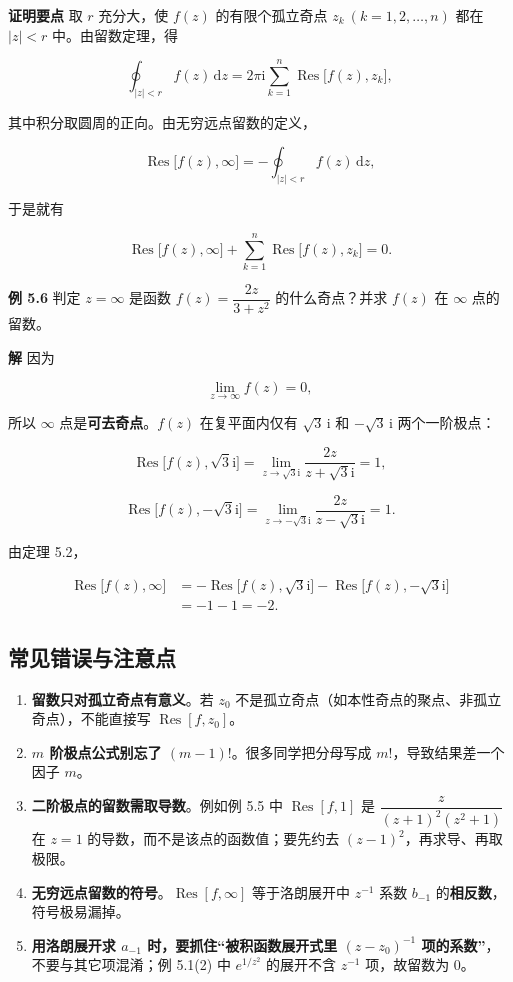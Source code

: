 \textbf{证明要点} 取 \(r\) 充分大，使 \(f(z)\) 的有限个孤立奇点
\(z_k\ (k=1,2,\ldots,n)\) 都在 \(|z|<r\) 中。由留数定理，得

\[
\oint_{|z|<r}f(z)\,\mathrm dz
=2\pi\mathrm i\sum_{k=1}^{n}\operatorname{Res}\bigl[f(z),z_k\bigr],
\]

其中积分取圆周的正向。由无穷远点留数的定义，

\[
\operatorname{Res}\bigl[f(z),\infty\bigr]=-\oint_{|z|<r}f(z)\,\mathrm dz,
\]

于是就有

\[
\operatorname{Res}\bigl[f(z),\infty\bigr]+\sum_{k=1}^{n}\operatorname{Res}\bigl[f(z),z_k\bigr]=0 .
\]

\textbf{例 5.6} 判定 \(z=\infty\) 是函数 \(f(z)=\dfrac{2z}{3+z^{2}}\)
的什么奇点？并求 \(f(z)\) 在 \(\infty\) 点的留数。

\textbf{解} 因为

\[
\lim_{z\to\infty}f(z)=0,
\]

所以 \(\infty\) 点是\textbf{可去奇点}。\(f(z)\) 在复平面内仅有
\(\sqrt3\,\mathrm i\) 和 \(-\sqrt3\,\mathrm i\) 两个一阶极点：

\[
\operatorname{Res}\bigl[f(z),\sqrt3\mathrm i\bigr]
=\lim_{z\to\sqrt3\mathrm i}\frac{2z}{z+\sqrt3\mathrm i}=1,
\]

\[
\operatorname{Res}\bigl[f(z),-\sqrt3\mathrm i\bigr]
=\lim_{z\to-\sqrt3\mathrm i}\frac{2z}{z-\sqrt3\mathrm i}=1.
\]

由定理 5.2，

\[
\begin{aligned}
\operatorname{Res}\bigl[f(z),\infty\bigr]
&=-\operatorname{Res}\bigl[f(z),\sqrt3\mathrm i\bigr]-\operatorname{Res}\bigl[f(z),-\sqrt3\mathrm i\bigr]\\
&=-1-1=-2 .
\end{aligned}
\]

\subsection{常见错误与注意点}\label{ux5e38ux89c1ux9519ux8befux4e0eux6ce8ux610fux70b9-12}

\begin{enumerate}
\def\labelenumi{\arabic{enumi}.}
\tightlist
\item
  \textbf{留数只对孤立奇点有意义}。若 \(z_0\)
  不是孤立奇点（如本性奇点的聚点、非孤立奇点），不能直接写
  \(\operatorname{Res}[f,z_0]\)。
\item
  \textbf{\(m\) 阶极点公式别忘了 \((m-1)!\)}。很多同学把分母写成
  \(m!\)，导致结果差一个因子 \(m\)。
\item
  \textbf{二阶极点的留数需取导数}。例如例 5.5 中
  \(\operatorname{Res}[f,1]\) 是 \(\dfrac{z}{(z+1)^2(z^2+1)}\) 在
  \(z=1\) 的导数，而不是该点的函数值；要先约去
  \((z-1)^2\)，再求导、再取极限。
\item
  \textbf{无穷远点留数的符号}。\(\operatorname{Res}[f,\infty]\)
  等于洛朗展开中 \(z^{-1}\) 系数 \(b_{-1}\)
  的\textbf{相反数}，符号极易漏掉。
\item
  \textbf{用洛朗展开求 \(a_{-1}\) 时，要抓住``被积函数展开式里
  \((z-z_0)^{-1}\) 项的系数''}，不要与其它项混淆；例 5.1(2) 中
  \(e^{1/z^2}\) 的展开不含 \(z^{-1}\) 项，故留数为 \(0\)。
\end{enumerate}

